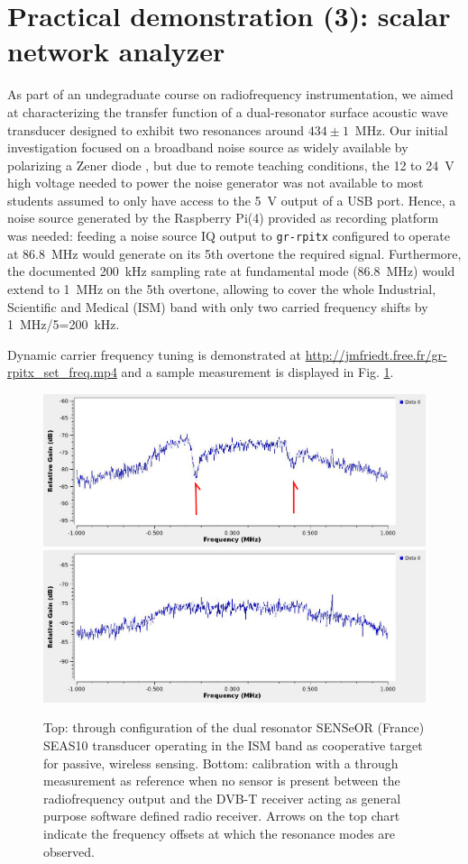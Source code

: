 \documentclass{article}
\begin{document}
\section{Practical demonstration (3): scalar network analyzer}

As part of an undegraduate course on radiofrequency instrumentation,
we aimed at characterizing the transfer function of a dual-resonator
surface acoustic wave transducer designed to exhibit two resonances
around $434\pm 1$~MHz. Our initial investigation focused on a broadband
noise source as widely available by polarizing a Zener diode \cite{zener1,zener2},
but due to remote teaching conditions, the 12 to 24~V high voltage needed to 
power the noise generator was not available to most students assumed
to only have access to the 5~V output of a USB port. Hence, a noise source
generated by the Raspberry Pi(4) provided as recording platform was needed:
feeding a noise source IQ output to {\tt gr-rpitx} configured to operate
at 86.8~MHz would generate on its 5th overtone the required signal. Furthermore,
the documented 200~kHz sampling rate at fundamental mode (86.8~MHz) would extend
to 1~MHz on the 5th overtone, allowing to cover the whole Industrial, Scientific
and Medical (ISM) band with only two carried frequency shifts by 1~MHz/5=200~kHz.

Dynamic carrier frequency tuning is demonstrated at
\url{http://jmfriedt.free.fr/gr-rpitx_set_freq.mp4} and a sample measurement is
displayed in Fig. \ref{s21}.

\begin{figure}[h!tb]
\includegraphics[width=\linewidth]{s21_SEAS10.jpg}
\includegraphics[width=\linewidth]{s21through.jpg}
\caption{Top: through configuration of the dual resonator SENSeOR (France) SEAS10 transducer
operating in the ISM band as cooperative target for passive, wireless sensing. Bottom: calibration
with a through measurement as reference when no sensor is present between the radiofrequency
output and the DVB-T receiver acting as general purpose software defined radio receiver. Arrows
on the top chart indicate the frequency offsets at which the resonance modes are observed.}
\label{s21}
\end{figure}
\end{document}
